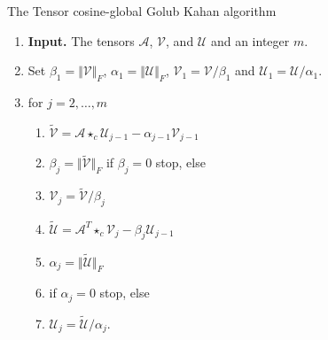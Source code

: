\documentclass{siamltex}
\newcommand{\1}{\mathbb{1}}
\newcommand{\0}{\mathbb{0}}
\begin{document}
	\begin{algorithm}[h!]
		\caption{The Tensor  cosine-global Golub Kahan algorithm}\label{TG-GK}
		\begin{enumerate}
			\item {\bf Input.} The tensors $\mathscr {A}$, $\mathscr{V}$, and $\mathscr {U}$ and an integer $m$.
			\item 	Set $\beta_1= \Vert \mathscr{V}\Vert_F$, $\alpha_1= \Vert \mathscr {U}  \Vert_F$, $\mathscr {V}_1=\mathscr {V}/\beta_1$ and 
			$\mathscr {U}_1=\mathscr {U}/\alpha_1$.
			\item for $j=2,\ldots,m$
			\begin{enumerate}
				\item $\widetilde {\mathscr {V}}= \mathscr {A} \star_c \mathscr {U}_{j-1} -\alpha_{j-1}\mathscr {V}_{j-1}$
				\item $\beta_j=\Vert \widetilde {\mathscr {V}}\Vert_F$ if $\beta_j=0$ stop, else
				\item $\mathscr {V}_j=\widetilde {\mathscr {V}}/\beta_j$
				\item $\widetilde {\mathscr {U}}=\mathscr {A}^T \star_c \mathscr {V}_j-\beta_j \mathscr{U} _{j-1}$
				\item $\alpha_j=\Vert \widetilde {\mathscr {U}} \Vert_F$
				\item if $\alpha_j=0$ stop, else
				\item $\mathscr {U}_j=\widetilde {\mathscr {U}}/\alpha_j$.
			\end{enumerate}
		\end{enumerate}
		
	\end{algorithm}
	
	\medskip 
	
\end{document}
